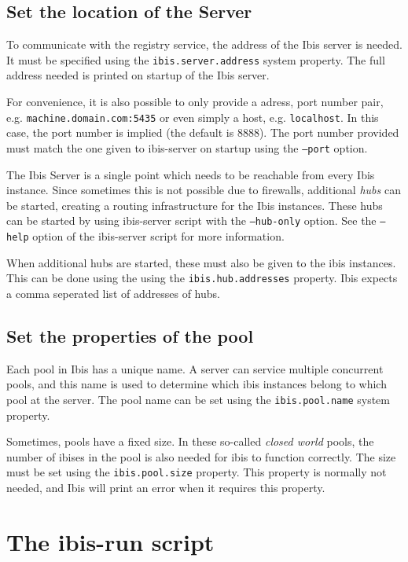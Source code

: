 \documentclass[10pt]{article}
\begin{document}
\subsection{Set the location of the Server}

To communicate with the registry service, the address of the Ibis server
is needed. It must be specified using the \texttt{ibis.server.address}
system property. The full address needed is printed on startup of the Ibis
server. 

For convenience, it is also possible to only provide a adress,
port number pair, e.g. \texttt{machine.domain.com:5435} or even simply a
host, e.g. \texttt{localhost}. In this case, the port number is implied
(the default is 8888). The port number provided must match the one given
to ibis-server on startup using the \texttt{--port} option.

The Ibis Server is a single point which needs to be reachable from every
Ibis instance. Since sometimes this is not possible due to firewalls,
additional \emph{hubs} can be started, creating a routing infrastructure
for the Ibis instances. These hubs can be started by using ibis-server
script with the \texttt{--hub-only} option. See the \texttt{--help}
option of the ibis-server script for more information. 

When additional hubs are started, these must also be given to the ibis
instances. This can be done using the using the
\texttt{ibis.hub.addresses} property. Ibis expects a comma seperated
list of addresses of hubs.

\subsection{Set the properties of the pool}

Each pool in Ibis has a unique name. A server can service multiple
concurrent pools, and this name is used to determine which ibis
instances belong to which pool at the server. The pool name can be set
using the \texttt{ibis.pool.name} system property.

Sometimes, pools have a fixed size. In these so-called \emph{closed
world} pools, the number of ibises in the pool is also needed for ibis
to function correctly. The size must be set using the
\texttt{ibis.pool.size} property. This property is normally not needed,
and Ibis will print an error when it requires this property.

\section{The ibis-run script}
\end{document}
